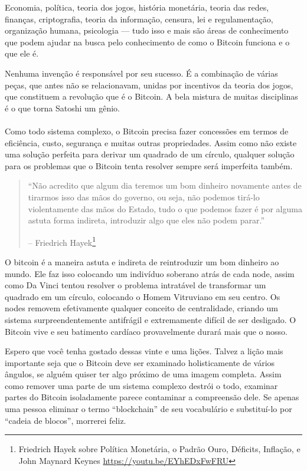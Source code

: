 Economia, política, teoria dos jogos, história monetária, teoria das redes, finanças, criptografia, teoria da informação, censura, lei e regulamentação, organização humana, psicologia --- tudo isso e mais são áreas de conhecimento que podem ajudar na busca pelo conhecimento de como o Bitcoin funciona e o que ele é.

Nenhuma invenção é responsável por seu sucesso. É a combinação de várias peças, que antes não se relacionavam, unidas por incentivos da teoria dos jogos, que constituem a revolução que é o Bitcoin. A bela mistura de muitas disciplinas é o que torna Satoshi um gênio.

\paragraph{}
Como todo sistema complexo, o Bitcoin precisa fazer concessões em termos de eficiência, custo, segurança e muitas outras propriedades. Assim como não existe uma solução perfeita para derivar um quadrado de um círculo, qualquer solução para os problemas que o Bitcoin tenta resolver sempre será imperfeita também.

\begin{quotation}\begin{samepage}
\enquote{Não acredito que algum dia teremos um bom dinheiro novamente antes de tirarmos isso das mãos do governo, ou seja, não podemos tirá-lo violentamente das mãos do Estado, tudo o que podemos fazer é por alguma astuta forma indireta, introduzir algo que eles não podem parar.}
\begin{flushright} -- Friedrich Hayek\footnote{Friedrich Hayek sobre Política Monetária, o Padrão Ouro, Déficits, Inflação, e John Maynard Keynes \url{https://youtu.be/EYhEDxFwFRU}}
\end{flushright}\end{samepage}\end{quotation}

O bitcoin é a maneira astuta e indireta de reintroduzir um bom dinheiro ao mundo. Ele faz isso colocando um indivíduo soberano atrás de cada node, assim como Da Vinci tentou resolver o problema intratável de transformar um quadrado em um círculo, colocando o Homem Vitruviano em seu centro. Os nodes removem efetivamente qualquer conceito de centralidade, criando um sistema surpreendentemente antifrágil e extremamente difícil de ser desligado. O Bitcoin vive e seu batimento cardíaco provavelmente durará mais que o nosso.

Espero que você tenha gostado dessas vinte e uma lições. Talvez a lição mais importante seja que o Bitcoin deve ser examinado holisticamente de vários ângulos, se alguém quiser ter algo próximo de uma imagem completa. Assim como remover uma parte de um sistema complexo destrói o todo, examinar partes do Bitcoin isoladamente parece contaminar a compreensão dele. Se apenas uma pessoa eliminar o termo \enquote{blockchain} de seu vocabulário e substituí-lo por \enquote{cadeia de blocos}, morrerei feliz.


